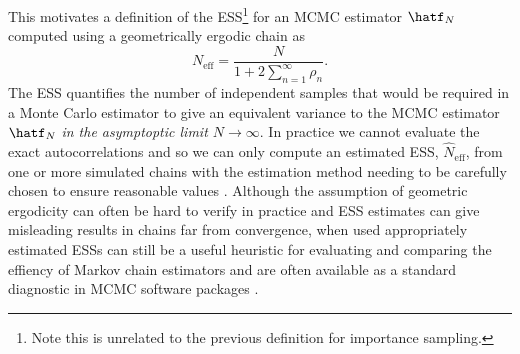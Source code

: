 This motivates a definition of the \ac{ESS}\footnote{Note this is unrelated to the previous definition for importance sampling.} for an \ac{MCMC} estimator $\hatf_N$ computed using a geometrically ergodic chain as
\begin{equation}\label{eq:effective-sample-size-mcmc}
  N_{\textrm{eff}} = \frac{N}{1 + 2\sum_{n=1}^\infty \rho_n}.
\end{equation} 
The \ac{ESS} quantifies the number of independent samples that would be required in a Monte Carlo estimator to give an equivalent variance to the \ac{MCMC} estimator $\hatf_N$ \emph{in the asymptoptic limit $N \to \infty$}. In practice we cannot evaluate the exact autocorrelations and so we can only compute an estimated \ac{ESS}, $\hat{N}_{\textrm{eff}}$, from one or more simulated chains with the estimation method needing to be carefully chosen to ensure reasonable values \citep{thompson2010comparison}. Although the assumption of geometric ergodicity can often be hard to verify in practice and \ac{ESS} estimates can give misleading results in chains far from convergence, when used appropriately estimated \acp{ESS} can still be a useful heuristic for evaluating and comparing the effiency of Markov chain estimators and are often available as a standard diagnostic in \ac{MCMC} software packages \citep{plummer2006coda,carpenter2016stan,salvatier2016probabilistic}.

